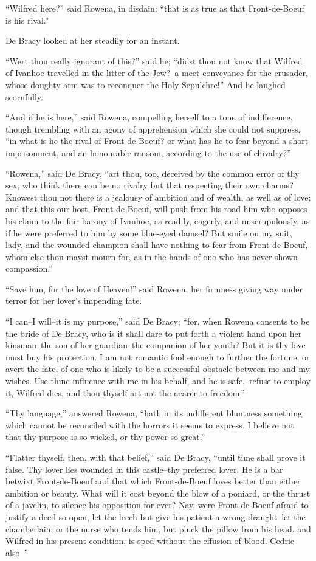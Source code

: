 ``Wilfred here?'' said Rowena, in disdain; ``that is as true as that
Front-de-Boeuf is his rival.''

De Bracy looked at her steadily for an instant.

``Wert thou really ignorant of this?'' said he; ``didst thou not know
that Wilfred of Ivanhoe travelled in the litter of the Jew?--a meet
conveyance for the crusader, whose doughty arm was to reconquer the Holy
Sepulchre!'' And he laughed scornfully.

``And if he is here,'' said Rowena, compelling herself to a tone of
indifference, though trembling with an agony of apprehension which she
could not suppress, ``in what is he the rival of Front-de-Boeuf? or what
has he to fear beyond a short imprisonment, and an honourable ransom,
according to the use of chivalry?''

``Rowena,'' said De Bracy, ``art thou, too, deceived by the common error
of thy sex, who think there can be no rivalry but that respecting their
own charms? Knowest thou not there is a jealousy of ambition and of
wealth, as well as of love; and that this our host, Front-de-Boeuf, will
push from his road him who opposes his claim to the fair barony of
Ivanhoe, as readily, eagerly, and unscrupulously, as if he were
preferred to him by some blue-eyed damsel? But smile on my suit, lady,
and the wounded champion shall have nothing to fear from Front-de-Boeuf,
whom else thou mayst mourn for, as in the hands of one who has never
shown compassion.''

``Save him, for the love of Heaven!'' said Rowena, her firmness giving
way under terror for her lover's impending fate.

``I can--I will--it is my purpose,'' said De Bracy; ``for, when Rowena
consents to be the bride of De Bracy, who is it shall dare to put forth
a violent hand upon her kinsman--the son of her guardian--the companion
of her youth? But it is thy love must buy his protection. I am not
romantic fool enough to further the fortune, or avert the fate, of one
who is likely to be a successful obstacle between me and my wishes. Use
thine influence with me in his behalf, and he is safe,--refuse to employ
it, Wilfred dies, and thou thyself art not the nearer to freedom.''

``Thy language,'' answered Rowena, ``hath in its indifferent bluntness
something which cannot be reconciled with the horrors it seems to
express. I believe not that thy purpose is so wicked, or thy power so
great.''

``Flatter thyself, then, with that belief,'' said De Bracy, ``until time
shall prove it false. Thy lover lies wounded in this castle--thy
preferred lover. He is a bar betwixt Front-de-Boeuf and that which
Front-de-Boeuf loves better than either ambition or beauty. What will it
cost beyond the blow of a poniard, or the thrust of a javelin, to
silence his opposition for ever? Nay, were Front-de-Boeuf afraid to
justify a deed so open, let the leech but give his patient a wrong
draught--let the chamberlain, or the nurse who tends him, but pluck the
pillow from his head, and Wilfred in his present condition, is sped
without the effusion of blood. Cedric also--''

